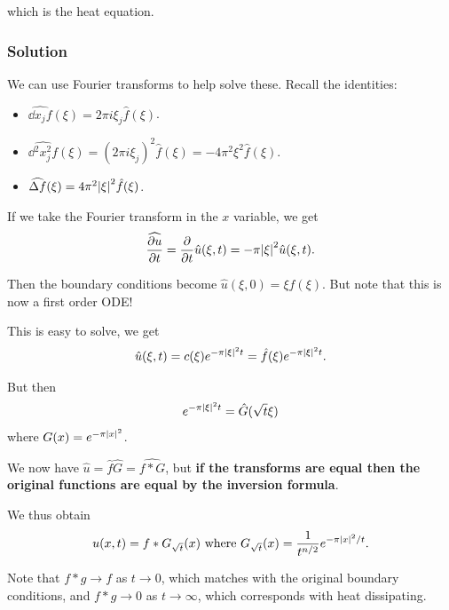 which is the heat equation.

\hypertarget{solution}{%
\subsubsection{Solution}\label{solution}}

We can use Fourier transforms to help solve these. Recall the
identities:

\begin{itemize}
\tightlist
\item
  \(\widehat{\dd{}{x_j} f}(\xi) = 2\pi i \xi_j \widehat{f}(\xi)\).
\item
  \(\widehat{\dd{^2}{x_j^2} f}(\xi) = (2\pi i \xi_j)^2\widehat{f}(\xi) = - 4\pi^2 \xi^2 \hat{f}(\xi)\).
\item
  \(\widehat{\Delta f}(\xi) = 4\pi^2 {\left\lvert {\xi} \right\rvert}^2 \hat{f}(\xi)\).
\end{itemize}

If we take the Fourier transform in the \(x\) variable, we get
\begin{align*}
\widehat{{\frac{\partial u}{\partial t}}} 
= {\frac{\partial }{\partial t}} \hat{u}(\xi, t) 
= -\pi {\left\lvert {\xi} \right\rvert}^2 \hat{u}(\xi, t)
.\end{align*}

Then the boundary conditions become \(\hat{u}(\xi, 0) = \xi{f}(\xi)\).
But note that this is now a first order ODE!

This is easy to solve, we get
\begin{align*}
\hat{u} (\xi, t) = c(\xi) e^{-\pi {\left\lvert {\xi} \right\rvert}^2 t} = \hat{f}(\xi) e^{-\pi {\left\lvert {\xi} \right\rvert}^2 t}
.\end{align*}

But then
\begin{align*}
e^{-\pi {\left\lvert {\xi} \right\rvert}^2 t} = \hat{G} (\sqrt t \xi)
\end{align*} where \(G(x) = e^{-\pi {\left\lvert {x} \right\rvert}^2}\).

We now have \(\hat{u} = \hat{f} \hat{G} = \widehat{f\ast G}\), but
\textbf{if the transforms are equal then the original functions are
equal by the inversion formula}.

We thus obtain
\begin{align*}
u(x, t) = f \ast G_{\sqrt t}(x) \text{ where } G_{\sqrt t}(x) = \frac{1}{t^{n/2}} e^{-\pi {\left\lvert {x} \right\rvert}^2/ t}
.\end{align*}

Note that \(f \ast g \to f\) as \(t \to 0\), which matches with the
original boundary conditions, and \(f \ast g \to 0\) as
\(t \to \infty\), which corresponds with heat dissipating.

